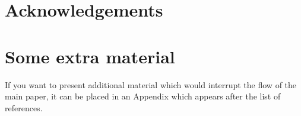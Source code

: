 \documentclass[a4paper,fleqn,usenatbib]{mnras}
\begin{document}
\section*{Acknowledgements}





% 




 


\appendix

\section{Some extra material}

If you want to present additional material which would interrupt the flow of the main paper,
it can be placed in an Appendix which appears after the list of references.



\bsp	%
\label{lastpage}
\end{document}
